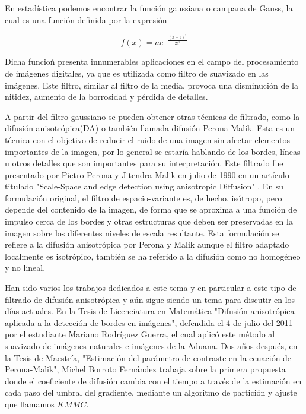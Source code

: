 \documentclass[a4paper,10pt,twocolumn]{article}
\begin{document}
En estad\'istica podemos encontrar la funci\'on gaussiana o campana de Gauss, la cual es una funci\'on definida por la expresi\'on

\begin{equation} \label{eqn:gauss}
	f(x) = ae^{-\frac{(x-b)^2}{2c^2}}
\end{equation}

Dicha funcio\'n presenta innumerables aplicaciones en el campo del procesamiento de im\'agenes digitales, ya que es utilizada como filtro de suavizado en las im\'agenes. Este filtro, similar al filtro de la media, provoca una disminuci\'on de la nitidez, aumento de la borrosidad y p\'erdida de detalles. 

A partir del filtro gaussiano se pueden obtener otras t\'ecnicas de filtrado, como la difusi\'on anisotr\'opica(DA) o tambi\'en llamada difusi\'on Perona-Malik. Esta es un t\'ecnica con el objetivo de reducir el ruido de una imagen sin afectar elementos importantes de la imagen, por lo general se estar\'ia hablando de los bordes, l\'ineas u otros detalles que son importantes para su interpretaci\'on. Este filtrado fue presentado por Pietro Perona y Jitendra Malik en julio de 1990 en un art\'iculo titulado "Scale-Space and edge detection using anisotropic Diffusion" \cite{perona_malik}. En su formulaci\'on original, el filtro de espacio-variante es, de hecho, is\'otropo, pero depende del contenido de la imagen, de forma que se aproxima a una funci\'on de impulso cerca de los bordes y otras estructuras que deben ser preservadas en la imagen sobre los diferentes niveles de escala resultante. Esta formulaci\'on se refiere a la difusi\'on anisotr\'opica por Perona y Malik aunque el filtro adaptado localmente es isotr\'opico, tambi\'en se ha referido a la difusi\'on como no homog\'eneo y no lineal.

Han sido varios los trabajos dedicados a este tema y en particular a este tipo de filtrado de difusi\'on anisotr\'opica y a\'un sigue siendo un tema para discutir en los d\'ias actuales. En la Tesis de Licenciatura en Matem\'atica "Difusi\'on anisotr\'opica aplicada a la detecci\'on de bordes en im\'agenes", defendida el 4 de julio del 2011 por el estudiante Mariano Rodr\'iguez Guerra, el cual aplic\'o este m\'etodo al suavizado de im\'agenes naturales e im\'agenes de la Aduana. Dos a\~nos despu\'es, en la Tesis de Maestr\'ia, "Estimaci\'on del par\'ametro de contraste en la ecuaci\'on de Perona-Malik", Michel Borroto Fern\'andez trabaja sobre la primera propuesta donde el coeficiente de difusi\'on cambia con el tiempo a trav\'es de la estimaci\'on en cada paso del umbral del gradiente, mediante un algoritmo de partici\'on y ajuste que llamamos $KMMC$.
\end{document}
